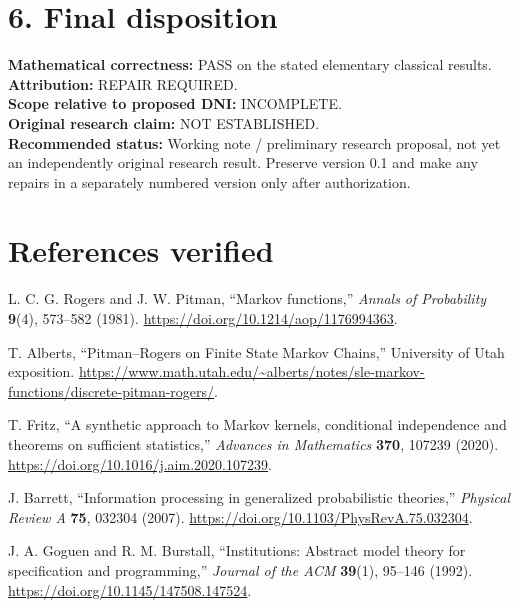 \documentclass[11pt,letterpaper]{article}
\begin{document}
\section*{6. Final disposition}
\textbf{Mathematical correctness:} PASS on the stated elementary classical results.\\
\textbf{Attribution:} REPAIR REQUIRED.\\
\textbf{Scope relative to proposed DNI:} INCOMPLETE.\\
\textbf{Original research claim:} NOT ESTABLISHED.\\
\textbf{Recommended status:} Working note / preliminary research proposal, not yet an independently original research result. Preserve version 0.1 and make any repairs in a separately numbered version only after authorization.

\section*{References verified}
\begin{enumerate}[label={[\arabic*]},leftmargin=24pt]
\item L. C. G. Rogers and J. W. Pitman, ``Markov functions,'' \emph{Annals of Probability} \textbf{9}(4), 573--582 (1981). \url{https://doi.org/10.1214/aop/1176994363}.
\item T. Alberts, ``Pitman--Rogers on Finite State Markov Chains,'' University of Utah exposition. \url{https://www.math.utah.edu/~alberts/notes/sle-markov-functions/discrete-pitman-rogers/}.
\item T. Fritz, ``A synthetic approach to Markov kernels, conditional independence and theorems on sufficient statistics,'' \emph{Advances in Mathematics} \textbf{370}, 107239 (2020). \url{https://doi.org/10.1016/j.aim.2020.107239}.
\item J. Barrett, ``Information processing in generalized probabilistic theories,'' \emph{Physical Review A} \textbf{75}, 032304 (2007). \url{https://doi.org/10.1103/PhysRevA.75.032304}.
\item J. A. Goguen and R. M. Burstall, ``Institutions: Abstract model theory for specification and programming,'' \emph{Journal of the ACM} \textbf{39}(1), 95--146 (1992). \url{https://doi.org/10.1145/147508.147524}.
\end{enumerate}
\end{document}

